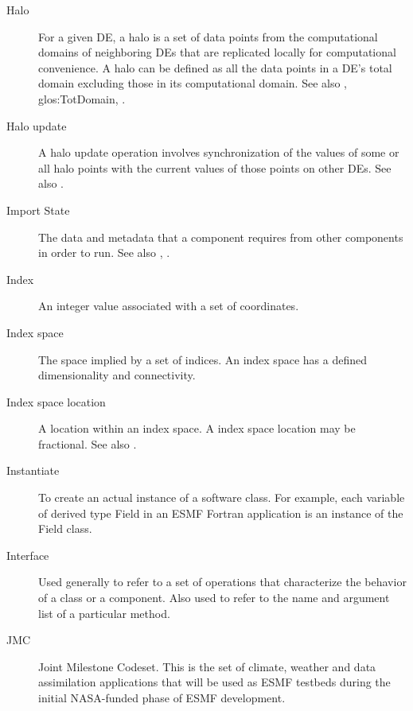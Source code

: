 \begin{description}
\label{glos:Halo} 
\item[Halo] 
  For a given DE, a halo is a set of data points from the computational 
  domains of neighboring DEs that are replicated locally for computational
  convenience.  A halo can be defined as all the data points 
  in a DE's total domain excluding those in its computational domain. 
  See also , 
  {glos:TotDomain}, .

\label{glos:HaloUpdate}
\item[Halo update] 
  A halo update operation involves synchronization of the values of some 
  or all halo points with the current values of those points on other DEs.
  See also .

\label{glos:ImportState} 
\item[Import State] 
  The data and metadata 
  that a component requires from other components in order to run.  
  See also , .

\label{glos:Index} 
\item[Index] 
  An integer value associated with a set of coordinates.

\label{glos:IndexSpace} 
\item[Index space] 
  The space implied 
  by a set of indices.  An index space has a defined dimensionality and 
  connectivity.

\label{glos:IndexSpaceLoc} 
\item[Index space location] 
  A location within an index space.  A index space location may be fractional.
  See also .

\label{glos:Instantiate}
\item[Instantiate] 
  To create an actual instance of a software class.  For example, each 
  variable of derived type Field in an ESMF Fortran application is an 
  instance of the Field class.

\label{glos:Interface}
\item[Interface] 
  Used generally to refer to a set of operations that characterize 
  the behavior of a class or a component.  Also used to refer to the
  name and argument list of a particular method.

\label{glos:JMC} 
\item[JMC] 
  Joint Milestone Codeset.  This is the set of climate, weather and
  data assimilation applications that will be used as ESMF testbeds 
  during the initial NASA-funded phase of ESMF development.


\end{description}
